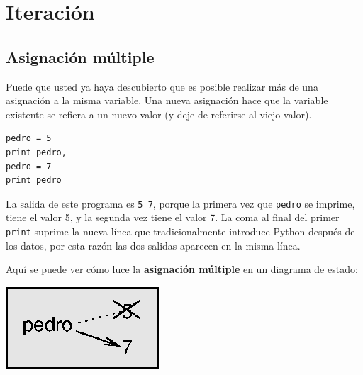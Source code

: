 

\chapter{Iteración}


\section{Asignación múltiple}

Puede que usted ya haya descubierto que es posible
realizar más de una asignación a la misma variable.
Una nueva asignación hace que la variable existente
se refiera a un nuevo valor (y deje de referirse
al viejo valor).

\beforeverb
\begin{verbatim}
pedro = 5
print pedro,
pedro = 7
print pedro
\end{verbatim}
\afterverb
%
La salida de este programa es \texttt{5 7}, porque la primera vez
que \texttt{pedro} se imprime, tiene el valor 5, y la segunda vez tiene
el valor 7. La coma al final del primer \texttt{print} suprime 
la nueva línea que tradicionalmente introduce Python después de 
los datos, por esta razón las dos salidas aparecen en la misma
línea.

Aquí se puede ver cómo luce la {\bf asignación múltiple } en un
diagrama de estado:

\beforefig
\centerline{\includegraphics{illustrations/assign2.eps}}
\afterfig

